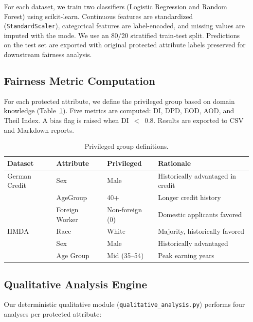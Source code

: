 \documentclass[11pt,a4paper]{article}
\begin{document}
For each dataset, we train two classifiers (Logistic Regression and
Random Forest) using scikit-learn. Continuous features are standardized
(\texttt{StandardScaler}), categorical features are label-encoded, and
missing values are imputed with the mode. We use an 80/20 stratified
train-test split. Predictions on the test set are exported with original
protected attribute labels preserved for downstream fairness analysis.

\subsection{Fairness Metric Computation}

For each protected attribute, we define the privileged group based on
domain knowledge (Table~\ref{tab:priv}). Five metrics are computed:
DI, DPD, EOD, AOD, and Theil Index. A bias flag is raised when
DI~$<$~0.8. Results are exported to CSV and Markdown reports.

\begin{table}[H]
\centering
\caption{Privileged group definitions.}
\label{tab:priv}
\begin{tabular}{llll}
\toprule
\textbf{Dataset} & \textbf{Attribute} & \textbf{Privileged} & \textbf{Rationale} \\
\midrule
German Credit & Sex              & Male     & Historically advantaged in credit \\
              & AgeGroup         & 40+      & Longer credit history \\
              & Foreign Worker   & Non-foreign (0) & Domestic applicants favored \\
\midrule
HMDA          & Race             & White    & Majority, historically favored \\
              & Sex              & Male     & Historically advantaged \\
              & Age Group        & Mid (35--54) & Peak earning years \\
\bottomrule
\end{tabular}
\end{table}

\subsection{Qualitative Analysis Engine}

Our deterministic qualitative module (\texttt{qualitative\_analysis.py})
performs four analyses per protected attribute:
\end{document}
